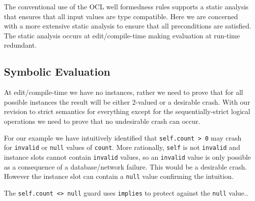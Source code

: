 \documentclass{llncs}
\begin{document}
The conventional use of the OCL well formedness rules supports a static analysis that ensures that all input values are type compatible. Here we are concerned with a more extensive  static analysis to ensure that all preconditions are satisfied. The static analysis occurs at edit/compile-time making evaluation at run-time redundant.

\subsection{Symbolic Evaluation}\label{Symbolic Evaluation}



At edit/compile-time we have no instances, rather we need to prove that for all possible instances the result will be either 2-valued or a desirable crash. With our revision to strict semantics for everything except for the sequentially-strict logical operations we need to prove that no undesirable crash can occur.

For our example we have intuitively identified that \verb|self.count > 0| may crash for \verb|invalid| or \verb|null| values of \verb|count|. More rationally, \verb|self| is not \verb|invalid| and instance slots cannot contain \verb|invalid| values, so an \verb|invalid| value is only possible as a consequence of a database/network failure. This would be a desirable crash. However the instance slot can contain a \verb|null| value confirming the intuition.

The \verb|self.count <> null| guard uses \verb|implies| to protect against the \verb|null| value..
\end{document}
